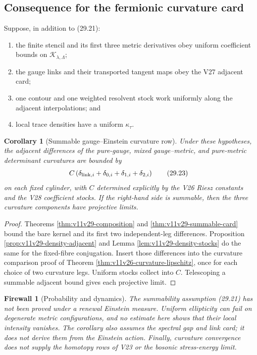 \documentclass[11pt]{article}
\newtheorem{corollary}[theorem]{Corollary}
\newtheorem{firewall}[theorem]{Firewall}
\begin{document}
\subsection{Consequence for the fermionic curvature card}

Suppose, in addition to (29.21):
\begin{enumerate}[label=\textnormal{(\roman*)}]
\item the finite stencil and its first three metric derivatives obey
uniform coefficient bounds on \(\mathcal K_{\lambda,\Lambda}\);
\item the gauge links and their transported tangent maps obey the V27
adjacent card;
\item one contour and one weighted resolvent stock work uniformly along
the adjacent interpolations; and
\item local trace densities have a uniform \(\kappa_\tau\).
\end{enumerate}

\begin{corollary}[Summable gauge--Einstein curvature row]
\label{cor:v11v29-curvature-row}
Under these hypotheses, the adjacent differences of the pure-gauge,
mixed gauge--metric, and pure-metric determinant curvatures are bounded
by
\[
 C\left(
 \delta_{{\rm link},i}
 +\delta_{0,i}+\delta_{1,i}+\delta_{2,i}
 \right)
 \tag{29.23}
\]
on each fixed cylinder, with \(C\) determined explicitly by the V26
Riesz constants and the V28 coefficient stocks.  If the right-hand side
is summable, then the three curvature components have projective
limits.
\end{corollary}

\begin{proof}
Theorems \ref{thm:v11v29-composition} and
\ref{thm:v11v29-summable-card} bound the bare kernel and its first two
independent-leg differences.  Proposition
\ref{prop:v11v29-density-adjacent} and Lemma
\ref{lem:v11v29-density-stocks} do the same for the fixed-fibre
conjugation.  Insert those differences into the curvature comparison
proof of Theorem \ref{thm:v11v26-curvature-lipschitz}, once for each
choice of two curvature legs.  Uniform stocks collect into \(C\).
Telescoping a summable adjacent bound gives each projective limit.
\end{proof}

\begin{firewall}[Probability and dynamics]
\label{fw:v11v29-probability}
The summability assumption (29.21) has not been proved under a renewal
Einstein measure.  Uniform ellipticity can fail on degenerate metric
configurations, and no estimate here shows that their local intensity
vanishes.  The corollary also assumes the spectral gap and link card; it
does not derive them from the Einstein action.  Finally, curvature
convergence does not supply the homotopy rows of V23 or the bosonic
stress-energy limit.
\end{firewall}
\end{document}
